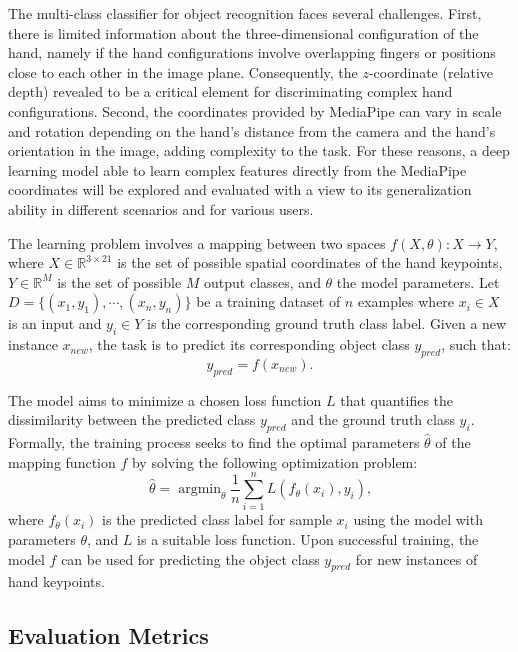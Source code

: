 The multi-class classifier for object recognition faces several challenges. First, there is limited information about the three-dimensional configuration of the hand, namely if the hand configurations involve overlapping fingers or positions close to each other in the image plane. Consequently, the $z$-coordinate (relative depth) revealed to be a critical element for discriminating complex hand configurations. Second, the coordinates provided by MediaPipe can vary in scale and rotation depending on the hand’s distance from the camera and the hand’s orientation in the image, adding complexity to the task. For these reasons, a deep learning model able to learn complex features directly from the MediaPipe coordinates will be explored and evaluated with a view to its generalization ability in different scenarios and for various users. 

The learning problem involves a mapping between two spaces $f(X,\theta): X \rightarrow Y$, where $X \in \mathbb{R}^{3\times21}$ is the set of possible spatial coordinates of the hand keypoints, $Y \in \mathbb{R}^{M}$ is the set of possible $M$ output classes, and $\theta$ the model parameters. Let $D = \{(x_1,y_1),\cdots,(x_n,y_n)\}$ be a training dataset of $n$ examples where $x_i \in X$ is an input and $y_i \in Y$ is the corresponding ground truth class label. 
Given a new instance $x_{new}$, the task is to predict its corresponding object class $y_{pred}$, such that:
\begin{equation}
y_{pred} = f(x_{new})\text{.}
\end{equation}

The model aims to minimize a chosen loss function $L$ that quantifies the dissimilarity between the predicted class $y_{pred}$ and the ground truth class $y_i$. Formally, the training process seeks to find the optimal parameters $\hat{\theta}$ of the mapping function $f$ by solving the following optimization problem:
\begin{equation}\label{eq:optimaltheta}
\hat{\theta} = \mathop{\mathrm{argmin}}_{\theta}\frac{1}{n} \sum_{i=1}^{n} L\left(f_{\theta}(x_i),y_i\right)\text{,}
\end{equation}
%
where $f_{\theta}(x_i)$ is the predicted class label for sample $x_i$ using the model with parameters $\theta$, and $L$ is a suitable loss function. Upon successful training, the model $f$ can be used for predicting the object class $y_{pred}$ for new instances of hand keypoints.

\subsection{Evaluation Metrics}

